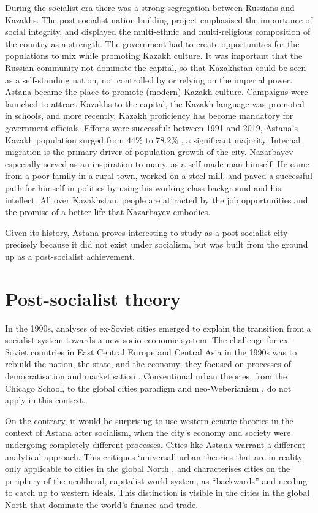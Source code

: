 \documentclass{article}
\begin{document}
During the socialist era there was a strong segregation between Russians and Kazakhs. The post-socialist nation building project emphasised the importance of social integrity, and displayed the multi-ethnic and multi-religious composition of the country as a strength. The government had to create opportunities for the populations to mix while promoting Kazakh culture. It was important that the Russian community not dominate the capital, so that Kazakhstan could be seen as a self-standing nation, not controlled by or relying on the imperial power. 
Astana became the place to promote (modern) Kazakh culture. Campaigns were launched to attract Kazakhs to the capital, the Kazakh language was promoted in schools, and more recently, Kazakh proficiency has become mandatory for government officials. Efforts were successful: between 1991 and 2019, Astana's Kazakh population surged from 44\% to 78.2\% \parencite{unfpa2020wekazakhstan}, a significant majority. 
Internal migration is the primary driver of population growth of the city. Nazarbayev especially served as an inspiration to many, as a self-made man himself. He came from a poor family in a rural town, worked on a steel mill, and paved a successful path for himself in politics by using his working class background and his intellect. All over Kazakhstan, people are attracted by the job opportunities and the promise of a better life that Nazarbayev embodies.

Given its history, Astana proves interesting to study as a post-socialist city precisely because it did not exist under socialism, but was built from the ground up as a post-socialist achievement.

\section{Post-socialist theory}

In the 1990s, analyses of ex-Soviet cities emerged to explain the transition from a socialist system towards a new socio-economic system. The challenge for ex-Soviet countries in East Central Europe and Central Asia in the 1990s was to rebuild the nation, the state, and the economy; they focused on processes of democratisation and marketisation \parencite{ferenvcuhova2016introduction}. Conventional urban theories, from the Chicago School, to the global cities paradigm and neo-Weberianism \parencite{haussermann2005european}, do not apply in this context.

On the contrary, it would be surprising to use western-centric theories in the context of Astana after socialism, when the city's economy and society were undergoing completely different processes. Cities like Astana warrant a different analytical approach. This critiques `universal' urban theories that are in reality only applicable to cities in the global North \parencite{ferenvcuhova2016accounts} \parencite{robinson2013ordinary}, and characterises cities on the periphery of the neoliberal, capitalist world system, as ``backwards'' and needing to catch up to western ideals. This distinction is visible in the cities in the global North that dominate the world's finance and trade.
\end{document}
